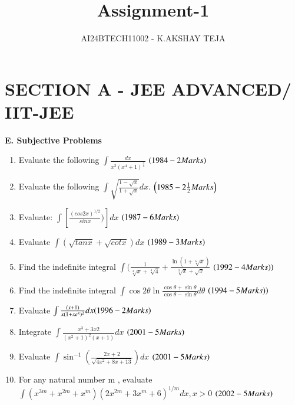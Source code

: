 \documentclass[journal,12pt,twocolumn]{IEEEtran}
\theoremstyle{remark}
\begin{document}

\vspace{3cm}

\title{Assignment-1}
\author{AI24BTECH11002 - K.AKSHAY TEJA}
\maketitle
\newpage
\bigskip

\renewcommand{\thefigure}{\theenumi}
\renewcommand{\thetable}{\theenumi}
\large\large\section{\textbf{SECTION A - JEE ADVANCED/ IIT-JEE}}\small\small

\textbf{E. Subjective Problems}
 \begin{enumerate}
    
\item   Evaluate the following $\int\frac{dx}{x^2(x^4 +1)^\frac{3}{4}} $ 
         \hfill  ${\left(1984 - 2 Marks\right)}  $
\item   Evaluate the following $\int \sqrt{\frac{1 - \sqrt{x}}{1 + \sqrt{x}}}   dx$.\hfill
  {$\left(1985 - 2\frac{1}{2} Marks\right)$}  


\item Evaluate: $\int$$[\frac{(cos2x)^{1/2}}{sin x})]dx$ \hfill  {$\left(1987 - 6 Marks\right)$} 

\item   Evaluate {$\int(\sqrt{tan x}+\sqrt{cot x})dx$}      
  \hfill
$\left(1989 - 3 Marks \right)$
 

\item  Find the indefinite integral $\int$$(\frac{1}{\sqrt[3]{x} + \sqrt[4]{4}}+\frac{\ln (1+\sqrt[6]{x})}{\sqrt[3]{x}+\sqrt{x}}$  \hfill   {$\left(1992 - 4 Marks)\right)$} 

\item Find the indefinite integral \(\int \cos 2\theta \ln \frac{\cos \theta + \sin \theta}{\cos \theta - \sin \theta}   d\theta\) \hfill  {$\left(1994 - 5 Marks)\right)$}


\item  Evaluate $\int\frac{(x + 1)}{x(1 + xe^x)^2}dx  \hfill { \brak{1996 - 2 Marks}}$

\item Integrate $\int\frac{x^{3}+3x 2}{(x^{2}+ 1)^{2}(x + 1)}dx$ \hfill  $ {\left(2001 - 5 Marks\right)}$

\item   Evaluate $\int \sin^{-1} (\frac{2x + 2}{\sqrt{4x^{2}+8x+13}})dx$    \hfill    ${\left(2001 - 5 Marks\right)}$

\item  For any natural number m , evaluate ${\int(x^{3m} + x^{2m}+x^{m})(2x^{2m}+3x^{m}+6)^{1/m}dx,x>0}$    \hfill   $\left(2002 - 5 Marks\right)$ 
 
\end{enumerate}
\end{document}
